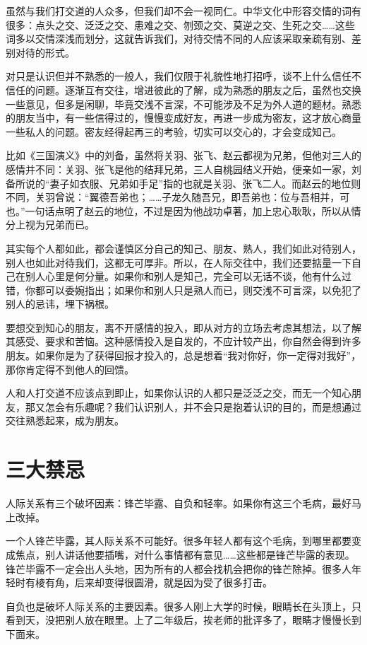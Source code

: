 \documentclass[fontset=fandol, a4paper, 12pt, openright]{ctexbook}
\begin{document}
虽然与我们打交道的人众多，但我们却不会一视同仁。中华文化中形容交情的词有很多：点头之交、泛泛之交、患难之交、刎颈之交、莫逆之交、生死之交……这些词多以交情深浅而划分，这就告诉我们，对待交情不同的人应该采取亲疏有别、差别对待的形式。

对只是认识但并不熟悉的一般人，我们仅限于礼貌性地打招呼，谈不上什么信任不信任的问题。逐渐互有交往，增进彼此的了解，成为熟悉的朋友之后，虽然也交换一些意见，但多是闲聊，毕竟交浅不言深，不可能涉及不足为外人道的题材。熟悉的朋友当中，有一些信得过的，慢慢变成好友，再进一步成为密友，这才放心商量一些私人的问题。密友经得起再三的考验，切实可以交心的，才会变成知己。

比如《三国演义》中的刘备，虽然将关羽、张飞、赵云都视为兄弟，但他对三人的感情并不同：关羽、张飞是他的结拜兄弟，三人自桃园结义开始，便亲如一家，刘备所说的“妻子如衣服、兄弟如手足”指的也就是关羽、张飞二人。而赵云的地位则不同，关羽曾说：“翼德吾弟也；……子龙久随吾兄，即吾弟也：位与吾相并，可也。”一句话点明了赵云的地位，不过是因为他战功卓著，加上忠心耿耿，所以从情分上视为兄弟而已。

其实每个人都如此，都会谨慎区分自己的知己、朋友、熟人，我们如此对待别人，别人也如此对待我们，这都无可厚非。所以，在人际交往中，我们还要掂量一下自己在别人心里是何分量。如果你和别人是知己，完全可以无话不谈，他有什么过错，你都可以委婉指出；如果你和别人只是熟人而已，则交浅不可言深，以免犯了别人的忌讳，埋下祸根。

要想交到知心的朋友，离不开感情的投入，即从对方的立场去考虑其想法，以了解其感受、要求和苦恼。这种感情投入是自发的，不应计较产出，你自然会得到许多朋友。如果你是为了获得回报才投入的，总是想着“我对你好，你一定得对我好”，那你肯定得不到他人的回馈。

人和人打交道不应该点到即止，如果你认识的人都只是泛泛之交，而无一个知心朋友，那又怎会有乐趣呢？我们认识别人，并不会只是抱着认识的目的，而是想通过交往熟悉起来，成为朋友。

\section{三大禁忌}

人际关系有三个破坏因素：锋芒毕露、自负和轻率。如果你有这三个毛病，最好马上改掉。

一个人锋芒毕露，其人际关系不可能好。很多年轻人都有这个毛病，到哪里都要变成焦点，别人讲话他要插嘴，对什么事情都有意见……这些都是锋芒毕露的表现。锋芒毕露不一定会出人头地，因为所有的人都会找机会把你的锋芒除掉。很多人年轻时有棱有角，后来却变得很圆滑，就是因为受了很多打击。

自负也是破坏人际关系的主要因素。很多人刚上大学的时候，眼睛长在头顶上，只看到天，没把别人放在眼里。上了二年级后，挨老师的批评多了，眼睛才慢慢长到下面来。
\end{document}
